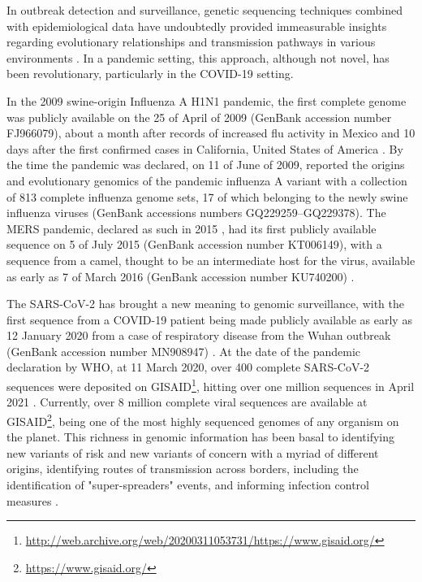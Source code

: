 In outbreak detection and surveillance, genetic sequencing techniques combined with epidemiological data have undoubtedly provided immeasurable insights regarding evolutionary relationships and transmission pathways in various environments \citep{beckett_pandemic_2021, lancet_genomic_2021}. 
In a pandemic setting, this approach, although not novel, has been revolutionary, particularly in the COVID-19 setting. 

In the 2009 swine-origin Influenza A H1N1 pandemic, the first complete genome was publicly available on the 25 of April of 2009 (GenBank accession number FJ966079), about a month after records of increased flu activity in Mexico and 10 days after the first confirmed cases in California, United States of America \citep{smith_origins_2009, novel_swine-origin_influenza_a_h1n1_virus_investigation_team_emergence_2009}. 
By the time the pandemic was declared, on 11 of June of 2009, \cite{smith_origins_2009} reported the origins and evolutionary genomics of the pandemic influenza A variant with a collection of 813 complete influenza genome sets, 17 of which belonging to the newly swine influenza viruses (GenBank accessions numbers GQ229259–GQ229378). 
The MERS pandemic, declared as such in 2015 \citep{piret_pandemics_2021}, had its first publicly available sequence on 5 of July 2015 (GenBank accession number KT006149)\citep{lu_complete_2015}, with a sequence from a camel, thought to be an intermediate host for the virus, available as early as 7 of March 2016 (GenBank accession number KU740200) \citep{kandeil_complete_2016, al-shomrani_genomic_2020}. 

The SARS-CoV-2 has brought a new meaning to genomic surveillance, with the first sequence from a COVID-19 patient being made publicly available as early as 12 January 2020 from a case of respiratory disease from the Wuhan outbreak (GenBank accession number MN908947) \citep{wu_new_2020}. 
At the date of the pandemic declaration by WHO, at 11 March 2020, over 400 complete SARS-CoV-2 sequences were deposited on GISAID\footnote{\url{http://web.archive.org/web/20200311053731/https://www.gisaid.org/}}, hitting over one million sequences in April 2021 \citep{maxmen_one_2021}. 
Currently, over 8 million complete viral sequences are available at GISAID\footnote{\url{https://www.gisaid.org/}}, being one of the most highly sequenced genomes of any organism on the planet. 
This richness in genomic information has been basal to identifying new variants of risk and new variants of concern with a myriad of different origins, identifying routes of transmission across borders, including the identification of "super-spreaders" events, and informing infection control measures \citep{lancet_genomic_2021, beckett_pandemic_2021, borges_sars-cov-2_2022}.  

